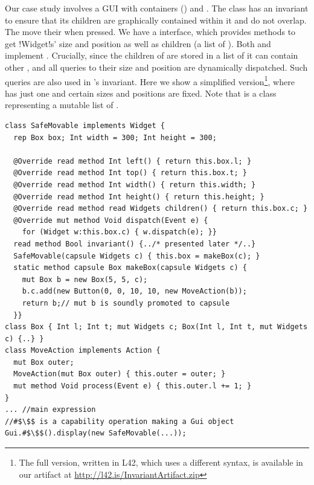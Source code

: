 Our case study involves a GUI with containers (\Q@SafeMovable@s) and \Q@Button@s.
The \Q@SafeMovable@ class has an invariant to ensure that its children are graphically contained within it and do not overlap. The \Q@Button@s move their \Q@SafeMovable@ when pressed. We have a \Q@Widget@ interface, which provides methods to get \Q!Widget!s' size and position as well as children (a list of \Q@Widget@s). Both \Q@SafeMovable@s and \Q@Button@s implement \Q@Widget@. Crucially, since the children of \Q@SafeMovable@ are stored in a list of \Q@Widget@s it can contain other \Q@SafeMovable@s, and all queries to their size and position are dynamically dispatched. Such queries are also used in \Q@SafeMovable@'s invariant.
Here we show a simplified version\footnote{The full version, written in L42, which uses a different syntax, is available in our artifact at \url{http://l42.is/InvariantArtifact.zip}}, where  \Q@SafeMovable@ has just one \Q@Button@ and certain sizes and positions are fixed. Note that \Q@Widgets@ is a class representing a mutable list of \Q@mut@ \Q@Widget@s.
\begin{lstlisting}
class SafeMovable implements Widget {
  rep Box box; Int width = 300; Int height = 300;

  @Override read method Int left() { return this.box.l; }
  @Override read method Int top() { return this.box.t; }
  @Override read method Int width() { return this.width; }
  @Override read method Int height() { return this.height; }
  @Override read method read Widgets children() { return this.box.c; }
  @Override mut method Void dispatch(Event e) {
    for (Widget w:this.box.c) { w.dispatch(e); }}
  read method Bool invariant() {../* presented later */..}
  SafeMovable(capsule Widgets c) { this.box = makeBox(c); }
  static method capsule Box makeBox(capsule Widgets c) {
    mut Box b = new Box(5, 5, c);
    b.c.add(new Button(0, 0, 10, 10, new MoveAction(b));
    return b;// mut b is soundly promoted to capsule
  }}
class Box { Int l; Int t; mut Widgets c; Box(Int l, Int t, mut Widgets c) {..} }
class MoveAction implements Action {
  mut Box outer;
  MoveAction(mut Box outer) { this.outer = outer; }
  mut method Void process(Event e) { this.outer.l += 1; }
}
... //main expression
//#$\$$ is a capability operation making a Gui object
Gui.#$\$$().display(new SafeMovable(...));
\end{lstlisting}%
